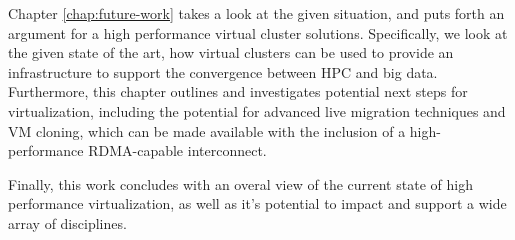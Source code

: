 Chapter \ref{chap:future-work} takes a look at the given situation, and puts forth an argument for a high performance virtual cluster solutions. Specifically, we look at the given state of the art, how virtual clusters can be used to provide an infrastructure to support the convergence between HPC and big data. Furthermore, this chapter outlines and investigates potential next steps for virtualization, including the potential for advanced live migration techniques and VM cloning, which can be made available with the inclusion of a high-performance RDMA-capable interconnect. 


Finally, this work concludes with an overal view of the current state of high performance virtualization, as well as it's potential to impact and support a wide array of disciplines. 




